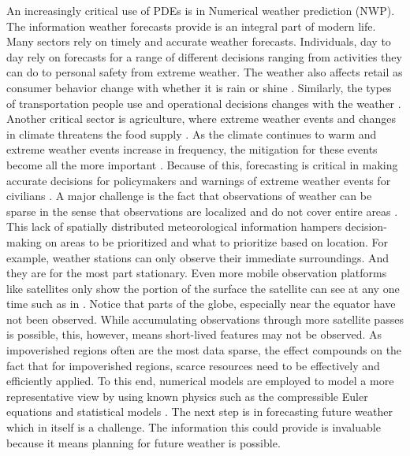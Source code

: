 An increasingly critical use of PDEs is in Numerical weather prediction (NWP). The information weather forecasts provide is an integral part of modern life. Many sectors rely on timely and accurate weather forecasts. Individuals, day to day rely on forecasts for a range of different decisions ranging from activities they can do to personal safety from extreme weather. The weather also affects retail as consumer behavior change with whether it is rain or shine \autocite{tianImpactWeatherConsumer2021,tianPredictingConsumerVarietyseeking2018,govindWeatherAffectPreference2020,moonWeatherSensitivityAnalysis2018}. Similarly, the types of transportation people use and operational decisions changes with the weather \autocite{lepageImpactWeatherActivities2021,nurmiExpectedImpactsValue2013}. Another critical sector is agriculture, where extreme weather events and changes in climate threatens the food supply \autocite{cogatoExtremeWeatherEvents2019,malhiImpactClimateChange2021,anwarAdaptingAgricultureClimate2013}. As the climate continues to warm and extreme weather events increase in frequency, the mitigation for these events become all the more important \autocite{ClimateChange20222023}. Because of this, forecasting is critical in making accurate decisions for policymakers and warnings of extreme weather events for civilians \autocite{astithaExtremeWeatherForecasting2023,stottAttributionExtremeWeather2016}.
A major challenge is the fact that observations of weather can be sparse in the sense that observations are localized and do not cover entire areas \autocite{wilbyRainfallTemperatureEstimation2013,monmonierAirApparentHow1999,galkinAssimilationSparseContinuous2020}. This lack of spatially distributed meteorological information hampers decision-making on areas to be prioritized and what to prioritize based on location. For example, weather stations can only observe their immediate surroundings. And they are for the most part stationary. Even more mobile observation platforms like satellites only show the portion of the surface the satellite can see at any one time such as in . Notice that parts of the globe, especially near the equator have not been observed. While accumulating observations through more satellite passes is possible, this, however, means short-lived features may not be observed. As impoverished regions often are the most data sparse, the effect compounds on the fact that for impoverished regions, scarce resources need to be effectively and efficiently applied. To this end, numerical models are employed to model a more representative view by using known physics such as the compressible Euler equations and statistical models \autocite{mengaldoCurrentEmergingTimeIntegration2019,kwasniokDatabasedStochasticSubgridscale2012}. The next step is in forecasting future weather which in itself is a challenge. The information this could provide is invaluable because it means planning for future weather is possible.
